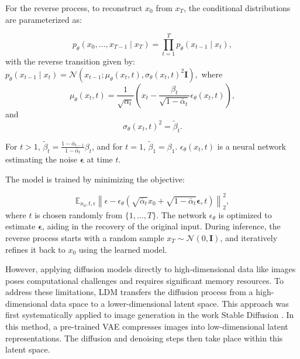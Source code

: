 \documentclass{IEEEtran}
\begin{document}
For the reverse process, to reconstruct $x_0$ from $x_T$, the conditional distributions are parameterized as:

\begin{equation}
p_{\theta}(x_0, \dots, x_{T-1} \mid x_T) = \prod_{t=1}^{T} p_{\theta}(x_{t-1} \mid x_t),
\end{equation}
with the reverse transition given by:
$
p_{\theta}(x_{t-1} \mid x_t) = \mathcal{N}(x_{t-1}; \mu_{\theta}(x_t, t), \sigma_{\theta}(x_t, t)^2 \mathbf{I}),
$
where
\begin{equation}
\mu_{\theta}(x_t, t) = \frac{1}{\sqrt{\alpha_t}} \left( x_t - \frac{\beta_t}{\sqrt{1 - \bar{\alpha}_t}} \epsilon_{\theta}(x_t, t) \right),
\end{equation}
and
\begin{equation}
\sigma_{\theta}(x_t, t)^2 = \tilde{\beta}_t.
\end{equation}

For $t > 1$, $\tilde{\beta}_t = \frac{1 - \bar{\alpha}_{t-1}}{1 - \bar{\alpha}_t} \beta_t$, and for $t = 1$, $\tilde{\beta}_1 = \beta_1$. $\epsilon_{\theta}(x_t, t)$ is a neural network estimating the noise $\bm{\epsilon}$ at time $t$.

The model is trained by minimizing the objective:

\begin{equation}
\mathbb{E}_{x_0, t, \epsilon}\left\|\epsilon - \epsilon_{\theta}\left(\sqrt{\bar{\alpha}_t} x_0 + \sqrt{1 - \bar{\alpha}_t} \bm{\epsilon}, t\right)\right\|_2^2,
\end{equation}
where $t$ is chosen randomly from $\{1, \dots, T\}$. The network $\epsilon_{\theta}$ is optimized to estimate $\bm{\epsilon}$, aiding in the recovery of the original input. During inference, the reverse process starts with a random sample $x_T \sim \mathcal{N}(0, \mathbf{I})$, and iteratively refines it back to $x_0$ using the learned model.


However, applying diffusion models directly to high-dimensional data like images poses computational challenges and requires significant memory resources. {To address these limitations, LDM transfers the diffusion process from a high-dimensional data space to a lower-dimensional latent space.} This approach was first systematically applied to image generation in the work Stable Diffusion \cite{rombach2022high}. In this method, a pre-trained VAE \cite{kingma2013auto} compresses images into low-dimensional latent representations. The diffusion and denoising steps then take place within this latent space.
\end{document}
